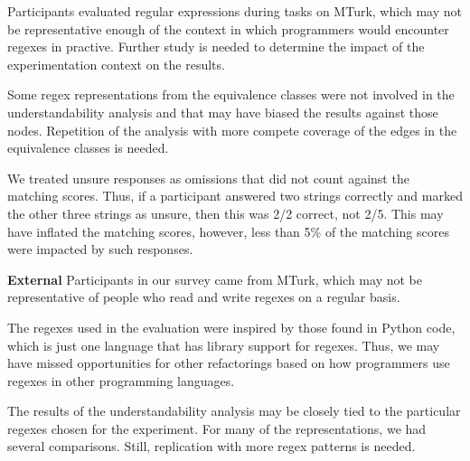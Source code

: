 Participants evaluated regular expressions during tasks on MTurk, which may not be representative enough of the context in which programmers would encounter regexes in practive. Further study is needed to determine the impact of the experimentation context on the results. 

Some regex representations from the equivalence classes were not involved in the understandability analysis and that may have biased the results against those nodes. Repetition of the analysis with more compete coverage of the edges in the equivalence classes is needed. 

We treated unsure responses as omissions that  did not count  against the matching scores. Thus, if a participant answered two strings correctly and marked the other three strings as unsure, then this was 2/2 correct, not 2/5. This may have inflated the matching scores, however, less than 5\% of the matching scores were impacted by such responses. 


%

\textbf{External}
Participants in our survey came from MTurk, which may not be representative of people who read and write regexes on a regular basis. 

The regexes  used in the evaluation were inspired by those found in Python code, which is just one language that has library support for regexes. Thus, we may have missed opportunities for other refactorings based on how programmers use regexes in other programming languages. 

The results of the understandability analysis may be closely tied to the particular regexes chosen for the experiment. For many of the representations, we had several comparisons. Still, replication with more regex patterns is needed.%


